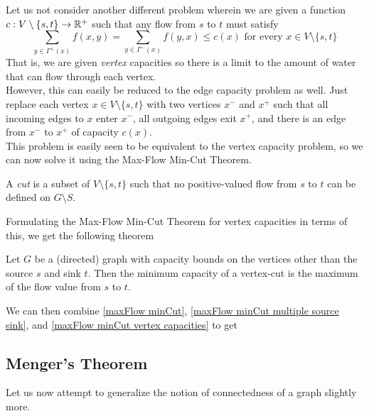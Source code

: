 Let us not consider another different problem wherein we are given a function $c:V\setminus \{s,t\}\to\mathbb{R}^+$ such that any flow from $s$ to $t$ must satisfy
\[
\sum_{y\in\Gamma^+(x)}f(x,y) = \sum_{y\in\Gamma^-(x)}f(y,x) \leq c(x)\text{ for every }x\in V\setminus\{s,t\}
\]
That is, we are given \textit{vertex} capacities so there is a limit to the amount of water that can flow through each vertex.\\

However, this can easily be reduced to the edge capacity problem as well. Just replace each vertex $x\in V\setminus\{s,t\}$ with two vertices $x^-$ and $x^+$ such that all incoming edges to $x$ enter $x^-$, all outgoing edges exit $x^+$, and there is an edge from $x^-$ to $x^+$ of capacity $c(x)$.\\
This problem is easily seen to be equivalent to the vertex capacity problem, so we can now solve it using the Max-Flow Min-Cut Theorem.

\begin{fdef}
A \textit{cut} is a subset of $V\setminus\{s,t\}$ such that no positive-valued flow from $s$ to $t$ can be defined on $G\setminus S$.
\end{fdef}

Formulating the Max-Flow Min-Cut Theorem for vertex capacities in terms of this, we get the following theorem

\begin{theorem}
\label{maxFlow minCut vertex capacities}
Let $G$ be a (directed) graph with capacity bounds on the vertices other than the source $s$ and sink $t$. Then the minimum capacity of a vertex-cut is the maximum of the flow value from $s$ to $t$.
\end{theorem}

We can then combine \cref{maxFlow minCut}, \cref{maxFlow minCut multiple source sink}, and \cref{maxFlow minCut vertex capacities} to get

\begin{ftheo}
\label{generalized maxFlow minCut}

\end{ftheo}

\subsection{Menger's Theorem}

Let us now attempt to generalize the notion of connectedness of a graph slightly more.

